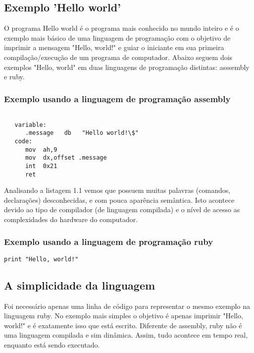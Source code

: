 \documentclass[12pt]{article}
\begin{document}
\subsection{Exemplo 'Hello world'}

   O programa Hello world é o programa mais conhecido no mundo inteiro e é o exemplo mais básico de uma linguagem de programação com o objetivo de imprimir a mensagem "Hello, world!" e guiar o iniciante em sua primeira compilação/execução de um programa de computador. Abaixo seguem dois exemplos "Hello, world" em duas linguagens de programação distintas: asssembly e ruby.


\subsubsection {Exemplo usando a linguagem de programação assembly}

\begin{lstlisting}[caption=Exemplo em assembly]

   variable:
      .message   db   "Hello world!\$"
   code:
      mov  ah,9
      mov  dx,offset .message
      int  0x21
      ret

\end{lstlisting}

Analisando a listagem 1.1 vemos que possuem muitas palavras (comandos, declarações) desconhecidas, e  com pouca aparência semântica. Isto acontece devido ao tipo de compilador (de linguagem compilada) e o nível de acesso as complexidades do hardware do computador. 

\subsubsection {Exemplo usando a linguagem de programação ruby}

\begin{lstlisting}[caption=Exemplo em ruby]
   print "Hello, world!"
\end{lstlisting}

\subsection { A simplicidade da linguagem }

Foi necessário apenas uma linha de código para representar o mesmo exemplo na linguagem ruby. No exemplo mais simples o objetivo é apenas imprimir "Hello, world!" e é exatamente isso que está escrito. Diferente de assembly, ruby não é uma linguagem compilada e sim dinâmica. Assim, tudo acontece em tempo real, enquanto está sendo executado.
   
\end{document}
